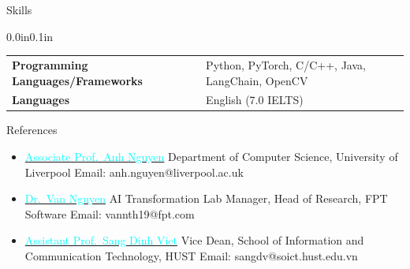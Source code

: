 \documentclass{resume} %
\makeatletter
\newcommand{\entry}[2]{#1 & #2 \tabularnewline} %
\newcommand{\tableEnv}[2]{%
  \begin{rSection}{#1} %
    \begin{adjustwidth}{0.0in}{0.1in} %
      \begin{tabularx}{\linewidth}{@{} >{\bfseries}l @{\hspace{6ex}} X @{}}
        #2 %
      \end{tabularx}
    \end{adjustwidth}
  \end{rSection}
}
\makeatother
\begin{document}


\tableEnv{Skills}{
    \entry{Programming Languages/Frameworks}{Python, PyTorch, C/C++, Java, LangChain, OpenCV}
    \entry{Languages}{English (7.0 IELTS)}
}

\begin{rSection}{References}
    \begin{itemize}{}{\itemsep=0.4em}  %
    
        \item \begin{rReference}
            {\href{https://cgi.csc.liv.ac.uk/~anguyen/}{\textcolor{cyan}{Associate Prof.\ Anh Nguyen}}}
            {Department of Computer Science, University of Liverpool}
            {Email: anh.nguyen@liverpool.ac.uk}
            {}
        \end{rReference}

        \item \begin{rReference}
            {\href{https://www.linkedin.com/in/vannguyen8/}{\textcolor{cyan}{Dr.\ Van Nguyen}}}
            {AI Transformation Lab Manager, Head of Research, FPT Software}
            {Email: vannth19@fpt.com}
            {}
        \end{rReference}

        \item \begin{rReference}
            {\href{https://users.soict.hust.edu.vn/sangdv/}{\textcolor{cyan}{Assistant Prof.\ Sang Dinh Viet}}}
            {Vice Dean, School of Information and Communication Technology, HUST}
            {Email: sangdv@soict.hust.edu.vn}
            {}
        \end{rReference}

    \end{itemize}
\end{rSection}
\end{document}
